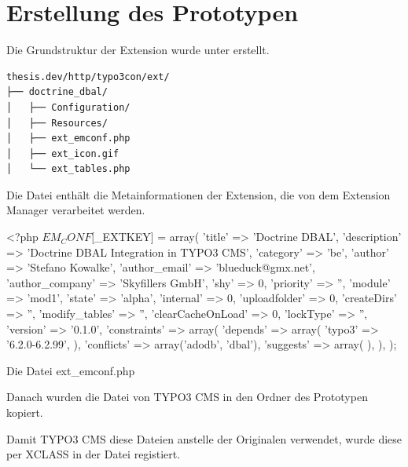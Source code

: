 \section{Erstellung des Prototypen}
\label{prototype:sec:createPrototype}

Die Grundstruktur der Extension wurde unter  erstellt.

\begin{Verbatim}[samepage=true]
thesis.dev/http/typo3con/ext/
├── doctrine_dbal/
│   ├── Configuration/
│   ├── Resources/
│   ├── ext_emconf.php
│   ├── ext_icon.gif
│   └── ext_tables.php
\end{Verbatim}

Die Datei  enthält die Metainformationen der Extension, die von dem Extension Manager verarbeitet werden.

\begin{listing}
\begin{phpcode}
<?php
$EM_CONF[$_EXTKEY] = array(
	'title' => 'Doctrine DBAL',
	'description' => 'Doctrine DBAL Integration in TYPO3 CMS',
	'category' => 'be',
	'author' => 'Stefano Kowalke',
	'author_email' => 'blueduck@gmx.net',
	'author_company' => 'Skyfillers GmbH',
	'shy' => 0,
	'priority' => '',
	'module' => 'mod1',
	'state' => 'alpha',
	'internal' => 0,
	'uploadfolder' => 0,
	'createDirs' => '',
	'modify_tables' => '',
	'clearCacheOnLoad' => 0,
	'lockType' => '',
	'version' => '0.1.0',
	'constraints' => array(
		'depends' => array(
			'typo3' => '6.2.0-6.2.99',
		),
		'conflicts' => array('adodb', 'dbal'),
		'suggests' => array(
		),
	),
);
\end{phpcode}
\caption{Die Datei ext\_emconf.php}
\label{lst:extEmconf}
\end{listing}

Danach wurden die Datei  von TYPO3 CMS in den Ordner  des Prototypen kopiert.

Damit TYPO3 CMS diese Dateien anstelle der Originalen verwendet, wurde diese per XCLASS in der Datei  registiert.

